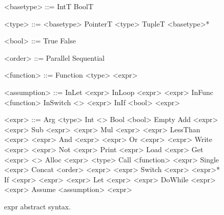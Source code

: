 
\begin{figure}%
  \begin{minipage}[t]{0.45\linewidth}
    \begin{grammar}

      <basetype> ::= IntT \alt BoolT

      <type> ::= <basetype> \alt PointerT <type> \alt TupleT <basetype>*

      <bool> ::= True \alt False


      <order> ::= Parallel \alt Sequential

      <function> ::= Function <type> <expr>

      <assumption> ::= InLet <expr>
      \alt InLoop <expr> <expr>
      \alt InFunc <function>
      \alt InSwitch <\N> <expr>
      \alt InIf <bool> <expr>



    \end{grammar}
  \end{minipage}\hfill%
  \begin{minipage}[t]{0.5\linewidth}
    \begin{grammar}
      <expr> ::= Arg <type>
      \alt Int <\N>
      \alt Bool <bool>
      \alt Empty
      \alt Add <expr> <expr>
      \alt Sub <expr> <expr>
      \alt Mul <expr> <expr>
      \alt LessThan <expr> <expr>
      \alt And <expr> <expr>
      \alt Or <expr> <expr>
      \alt Write <expr> <expr>
      \alt Not <expr>
      \alt Print <expr>
      \alt Load <expr>
      \alt Get <expr> <\N>
      \alt Alloc <expr> <type>
      \alt Call <function> <expr>
      \alt Single <expr>
      \alt Concat <order> <expr> <expr>
      \alt Switch <expr> <expr>*
      \alt If <expr> <expr> <expr>
      \alt Let <expr> <expr>
      \alt DoWhile <expr> <expr>
      \alt Assume <assumption> <expr>
    \end{grammar}%
    \end{minipage}%
  \caption{expr abstract syntax.}
\end{figure}

\renewcommand{\inferrule}[3]{\infrule[#1]{\mbox{#2}}{\mbox{#3}}}
\newcommand{\bigstep}[2]{#1 $\Downarrow$ #2}
\newcommand{\ang}[1]{$\langle #1 \rangle$}
\newcommand{\spair}[2]{\ang{#1, #2}}
\newcommand{\strip}[3]{\ang{#1, #2, #3}}

\newcommand{\targ}{\alpha}
\newcommand{\tmem}{\sigma}


\clearpage
\newpage

